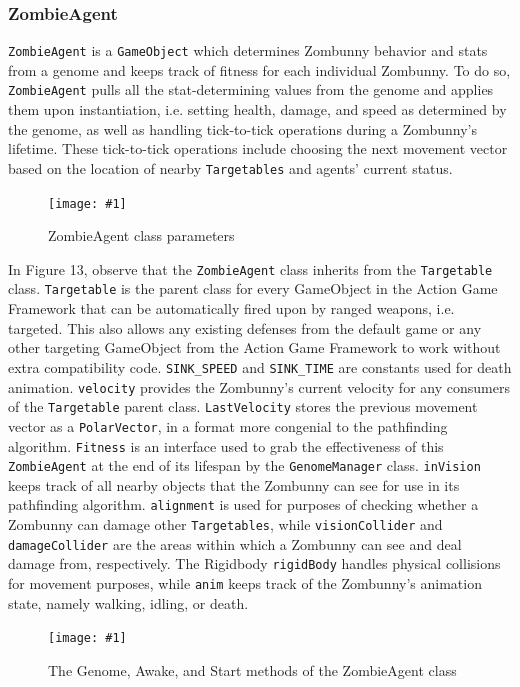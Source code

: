 \documentclass[letterpaper]{article}
\def\imfig#1#2{\begin{figure}[h] \centering \texttt{[image: \#1]} \caption{#2} \end{figure}}
\def\imfigH#1#2{\begin{figure}[H] \centering \texttt{[image: \#1]} \caption{#2} \end{figure}}
\begin{document}
\subsubsection{ZombieAgent}

\texttt{ZombieAgent} is a \texttt{GameObject} which determines Zombunny behavior
and stats from a genome and keeps track of fitness for each individual Zombunny.
To do so, \texttt{ZombieAgent} pulls all the stat-determining values from the
genome and applies them upon instantiation, i.e. setting health, damage, and
speed as determined by the genome, as well as handling tick-to-tick operations
during a Zombunny's lifetime. These tick-to-tick operations include choosing the
next movement vector based on the location of nearby \texttt{Targetables} and agents' current status.

\imfigH{ZombieAgent1}{ZombieAgent class parameters}

In Figure 13, observe that the \texttt{ZombieAgent} class inherits from the
\texttt{Targetable} class. \texttt{Targetable} is the parent class for every
GameObject in the Action Game Framework that can be automatically
fired upon by ranged weapons, i.e. targeted. This also allows any existing
defenses from the default game or any other targeting GameObject from the Action
Game Framework to work without extra compatibility code. \texttt{SINK\_SPEED} and
\texttt{SINK\_TIME} are constants used for death animation. \texttt{velocity} provides the
Zombunny's current velocity for any consumers of the \texttt{Targetable} parent class.
\texttt{LastVelocity} stores the previous movement vector as a \texttt{PolarVector}, in a format
more congenial to the pathfinding algorithm. \texttt{Fitness} is an interface used to
grab the effectiveness of this \texttt{ZombieAgent} at the end of its lifespan by the
\texttt{GenomeManager} class. \texttt{inVision} keeps track of all nearby objects that the
Zombunny can see for use in its pathfinding algorithm. \texttt{alignment} is used for
purposes of checking whether a Zombunny can damage other \texttt{Targetables}, while
\texttt{visionCollider} and \texttt{damageCollider} are the areas within which a Zombunny can see
and deal damage from, respectively. The Rigidbody \texttt{rigidBody} handles physical
collisions for movement purposes, while \texttt{anim} keeps track of the Zombunny's
animation state, namely walking, idling, or death.

\imfig{ZombieAgentInit}{The Genome, Awake, and Start methods of the ZombieAgent class}
\end{document}
